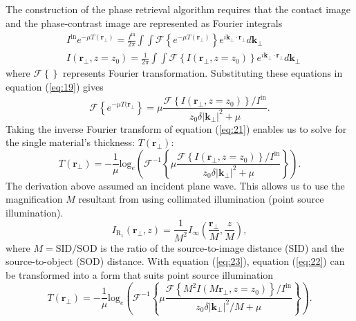 \documentclass[10pt, a4paper, singlespacing]{report}
\begin{document}
The construction of the phase retrieval algorithm requires that the contact image and the phase-contrast image are represented as Fourier integrals\cite{Pags2002}
\begin{align}\label{eq:20}
&I^{\mathrm{in}} e^{-\mu T(\mathbf{r}_{\perp})} = \frac{I^{\mathrm{in}}}{2 \pi} \int \int \mathscr{F} \left \{ e^{-\mu T(\mathbf{r}_{\perp})} \right \} e^{i \mathbf{k}_{\perp}\cdot \mathbf{r}_{\perp}} d \mathbf{k}_{\perp}
\\&I(\mathbf{r}_{\perp}, z=z_0) = \frac{1}{2 \pi}  \int \int \mathscr{F} \left \{ I (\mathbf{r}_{\perp}, z = z_0) \right \} e^{i \mathbf{k}_{\perp}\cdot \mathbf{r}_{\perp}} d \mathbf{k}_{\perp}
\end{align}
where $\mathscr{F}\left \{ \right \}$ represents Fourier transformation. Substituting these equations in equation (\ref{eq:19}) gives
\begin{equation}\label{eq:21}
\mathscr{F}\left \{ e^{-\mu T(\mathbf{r}_{\perp}} \right \} = \mu \frac{\mathscr{F}\left \{ I(\mathbf{r}_{\perp}, z=z_0)\right \}/I^{\mathrm{in}}}{z_0 \delta |\mathbf{k}_{\perp}|^{2} + \mu}.
\end{equation}
Taking the inverse Fourier transform of equation (\ref{eq:21}) enables us to solve for the single material's thickness: $T(\mathbf{r}_{\perp})$:
\begin{equation}\label{eq:22}
T(\mathbf{r}_{\perp}) = - \frac{1}{\mu} \mathrm{log}_{e} \left ( \mathscr{F}^{-1} \left \{ \mu \frac{ \mathscr{F} \left \{I(\mathbf{r}_{\perp}, z=z_0) \right \} /  I^{\mathrm{in}}}{z_0 \delta |\mathbf{k}_{\perp}|^{2} + \mu}  \right \} \right ).
\end{equation}
The derivation above assumed an incident plane wave. This allows us to use the magnification $M$ resultant from using collimated illumination (point source illumination)\cite{Pags2002}.
\begin{equation}\label{eq:23}
I_{\mathrm{R_{1}}}(\mathbf{r_{\perp}}, z) = \frac{1}{M^2} I_{\infty} \left ( \frac{\mathbf{r_\perp}}{M}, \frac{z}{M} \right ),
\end{equation}
where $M = \mathrm{SID/SOD}$ is the ratio of the source-to-image distance (SID) and the source-to-object (SOD) distance. With equation (\ref{eq:23}), equation (\ref{eq:22}) can be transformed into a form that suits point source illumination\cite{Pags2002}
\begin{equation}\label{eq:24}
T(\mathbf{r}_{\perp}) = - \frac{1}{\mu} \mathrm{log}_{e} \left ( \mathscr{F}^{-1} \left \{ \mu \frac{ \mathscr{F} \left \{M^2 I(M\mathbf{r}_{\perp}, z=z_0) \right \} /  I^{\mathrm{in}}}{z_0 \delta |\mathbf{k}_{\perp}|^{2}/M + \mu}  \right \} \right ).
\end{equation}
\end{document}
